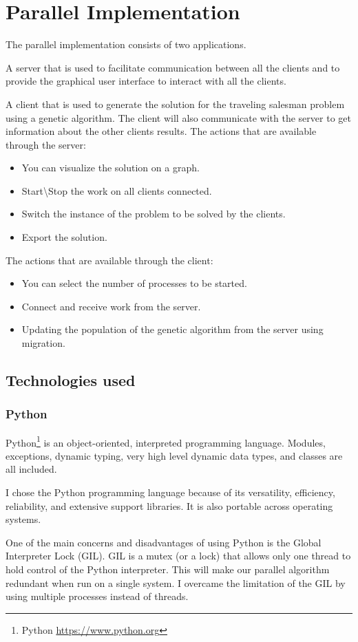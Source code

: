 \chapter{Parallel Implementation}
The parallel implementation consists of two applications.
\par
A server that is used to facilitate communication between all the clients and to provide the graphical user interface to interact with all the clients.
\par
A client that is used to generate the solution for the traveling salesman problem using a genetic algorithm. The client will also communicate with the server to get information about the other clients results.
\newline
The actions that are available through the server:
\begin{itemize}
  \item You can visualize the solution on a graph.
  \item Start\textbackslash Stop the work on all clients connected.
  \item Switch the instance of the problem to be solved by the clients.
  \item Export the solution.
\end{itemize}
\bigskip
The actions that are available through the client:
\begin{itemize}
  \item You can select the number of processes to be started.
  \item Connect and receive work from the server.
  \item Updating the population of the genetic algorithm from the server using migration.
\end{itemize}
\bigskip

\section{Technologies used}
\subsection{Python}
Python\footnote{Python \url{https://www.python.org}} is an object-oriented, interpreted programming language.
Modules, exceptions, dynamic typing, very high level dynamic data types, and classes are all included.
\par
I chose the Python programming language because of its versatility, efficiency, reliability, and extensive support libraries. It is also portable across operating systems.
\par
One of the main concerns and disadvantages of using Python is the Global Interpreter Lock (GIL). GIL is a mutex (or a lock) that allows only one thread to hold control of the Python interpreter. This will make our parallel algorithm redundant when run on a single system. I overcame the limitation of the GIL by using multiple processes instead of threads.
